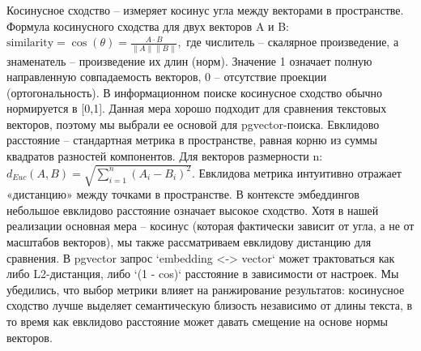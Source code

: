 Косинусное сходство – измеряет косинус угла между векторами в пространстве. Формула косинусного сходства для двух векторов A и B:
  $
  \text{similarity} = \cos(\theta) = \frac{A \cdot B}{\|A\|\|B\|},
  $
  где числитель – скалярное произведение, а знаменатель – произведение их длин (норм). Значение 1 означает полную направленную совпадаемость векторов, 0 – отсутствие проекции (ортогональность). В информационном поиске косинусное сходство обычно нормируется в [0,1]. Данная мера хорошо подходит для сравнения текстовых векторов, поэтому мы выбрали ее основой для pgvector-поиска.
Евклидово расстояние – стандартная метрика в пространстве, равная корню из суммы квадратов разностей компонентов. Для векторов размерности n:
  $d_{Euc}(A,B) = \sqrt{\sum_{i=1}^n (A_i - B_i)^2}.$
  Евклидова метрика интуитивно отражает «дистанцию» между точками в пространстве. В контексте эмбеддингов небольшое евклидово расстояние означает высокое сходство. Хотя в нашей реализации основная мера – косинус (которая фактически зависит от угла, а не от масштабов векторов), мы также рассматриваем евклидову дистанцию для сравнения. В pgvector запрос `embedding <-> vector` может трактоваться как либо L2-дистанция, либо `(1 - cos)` расстояние в зависимости от настроек. Мы убедились, что выбор метрики влияет на ранжирование результатов: косинусное сходство лучше выделяет семантическую близость независимо от длины текста, в то время как евклидово расстояние может давать смещение на основе нормы векторов.

